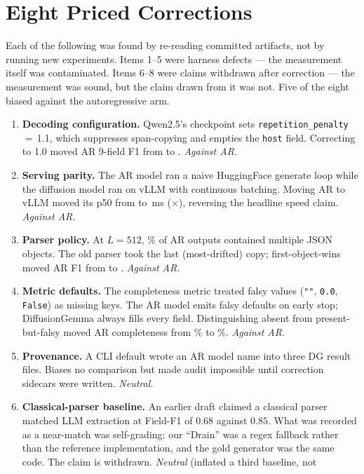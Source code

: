 \section{Eight Priced Corrections}
\label{app:defects} Each of the following was found by re-reading committed artifacts, not by
running new experiments. Items 1--5 were harness defects --- the measurement
itself was contaminated. Items 6--8 were claims withdrawn after correction
--- the measurement was sound, but the claim drawn from it was not. Five of
the eight biased against the autoregressive arm. \begin{enumerate}
\item \textbf{Decoding configuration.} Qwen2.5's checkpoint sets
\texttt{repetition\_penalty}\,$=$\,1.1, which suppresses span-copying and
empties the \texttt{host} field. Correcting to 1.0 moved AR 9-field F1 from
 to . \emph{Against AR.} \item \textbf{Serving parity.} The AR model ran a naive HuggingFace generate
loop while the diffusion model ran on vLLM with continuous batching. Moving
AR to vLLM moved its p50 from  to \,ms
($\times$), reversing the headline speed claim.
\emph{Against AR.} \item \textbf{Parser policy.} At $L{=}512$, \rambleRate\% of AR outputs
contained multiple JSON objects. The old parser took the last (most-drifted)
copy; first-object-wins moved AR F1 from  to
. \emph{Against AR.} \item \textbf{Metric defaults.} The completeness metric treated falsy values
(\texttt{""}, \texttt{0.0}, \texttt{False}) as missing keys. The AR model
emits falsy defaults on early stop; DiffusionGemma always fills every field.
Distinguishing absent from present-but-falsy moved AR completeness from
\% to \%. \emph{Against AR.} \item \textbf{Provenance.} A CLI default wrote an AR model name into three DG
result files. Biases no comparison but made audit impossible until correction
sidecars were written. \emph{Neutral.} \item \textbf{Classical-parser baseline.} An earlier draft claimed a classical
parser matched LLM extraction at Field-F1 of $0.68$ against $0.85$. What was
recorded as a near-match was self-grading: our ``Drain'' was a regex fallback
rather than the reference implementation, and the gold generator was the same
code. The claim is withdrawn. \emph{Neutral} (inflated a third baseline, not

\end{enumerate}
